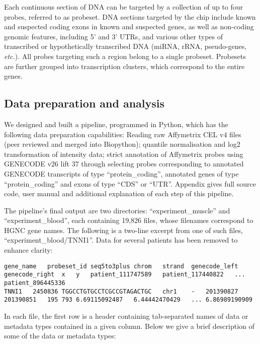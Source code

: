 \documentclass[10pt,letterpaper]{article}
\begin{document}
Each continuous section of DNA can be targeted by a collection of up to four probes, referred to as probeset. DNA sections targeted by the chip include known and suspected coding exons in known and suspected genes, as well as non-coding genomic features, including 5' and 3' UTRs, and various other types of transcribed or hypothetically transcribed DNA (miRNA, rRNA, pseudo-genes, {\it etc.}). All probes targeting such a region belong to a single probeset. Probesets are further grouped into transcription clusters, which correspond to the entire genes.

\subsection*{Data preparation and analysis}
\label{data_preparation}
We designed and built a pipeline, programmed in Python, which has the following data preparation capabilities:
Reading raw Affymetrix CEL v4 files (peer reviewed and merged into Biopython\cite{Cock2009, Kurkiewicz2016});
quantile normalisation and log2 transformation of intensity data;
strict annotation of Affymetrix probes using GENECODE v26 lift 37 through selecting probes corresponding to annotated GENECODE transcripts of type ``protein\_coding'', annotated genes of type ``protein\_coding'' and exons of type ``CDS'' or ``UTR''. Appendix  gives full source code, user manual and additional explanation of each step of this pipeline.

The pipeline's final output are two directories: ``experiment\_muscle'' and ``experiment\_blood'', each containing 19,826 files, whose filenames correspond to HGNC gene names. The following is a two-line excerpt from one of such files, ``experiment\_blood/TNNI1''. Data for several patients has been removed to enhance clarity:

\begin{lstlisting}[breaklines=true, frame=single, postbreak=\mbox{\textcolor{red}{$\hookrightarrow$}\space}]
gene_name	probeset_id	seq5to3plus	chrom	strand	genecode_left	genecode_right	x	y	patient_111747589	patient_117440822	...	patient_896445336
TNNI1	2450836	TGGCCTGTGCCTCGCCGTAGACTGC	chr1	-	201390827	201390851	195	793	6.69115092487	6.44442470429	...	6.86989190909
\end{lstlisting}

In each file, the first row is a header containing tab-separated names of data or metadata types contained in a given column. Below we give a brief description of some of the data or metadata types:
\end{document}
